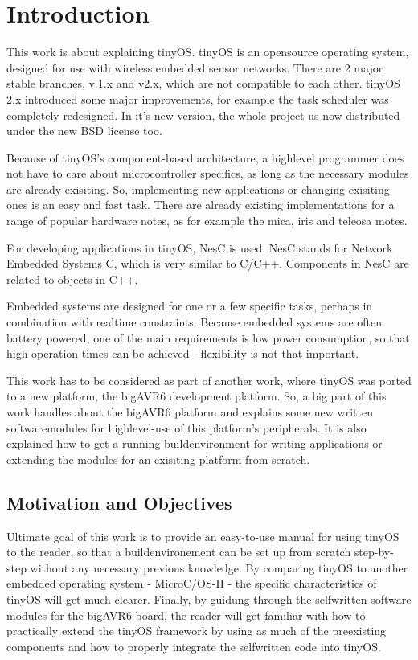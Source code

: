 
\chapter{Introduction} \label{chapter:introduction}

This work is about explaining tinyOS. tinyOS is an opensource operating system, designed for use with wireless embedded sensor networks. There are 2 major stable branches, v.1.x and v2.x, which are not compatible to each other. tinyOS 2.x introduced some major improvements, for example the task scheduler was completely redesigned. In it's new version, the whole project us now distributed under the new BSD license too.

Because of tinyOS's component-based architecture, a highlevel programmer does not have to care about microcontroller specifics, as long as the necessary modules are already exisiting. So, implementing new applications or changing exisiting ones is an easy and fast task. There are already existing implementations for a range of popular hardware notes, as for example the mica, iris and teleosa motes.

For developing applications in tinyOS, NesC is used. NesC stands for Network Embedded Systems C, which is very similar to C/C++. Components in NesC are related to objects in C++.

Embedded systems are designed for one or a few specific tasks, perhaps in combination with realtime constraints.
Because embedded systems are often battery powered, one of the main requirements is low power consumption, so that high operation times can be achieved - flexibility is not that important.

This work has to be considered as part of another work, where tinyOS was ported to a new platform, the bigAVR6 development platform. So, a big part of this work handles about the bigAVR6 platform and explains some new written softwaremodules for highlevel-use of this platform's peripherals. It is also explained how to get a running buildenvironment for writing applications or extending the modules for an exisiting platform from scratch.

\section{Motivation and Objectives}

Ultimate goal of this work is to provide an easy-to-use manual for using tinyOS to the reader, so that a buildenvironement can be set up from scratch step-by-step without any necessary previous knowledge. By comparing tinyOS to another embedded operating system - MicroC/OS-II -  the specific characteristics of tinyOS will get much clearer. Finally, by guidung through the selfwritten software modules for the bigAVR6-board, the reader will get familiar with how to practically extend the tinyOS framework by using as much of the preexisting components and how to properly integrate the selfwritten code into tinyOS.

